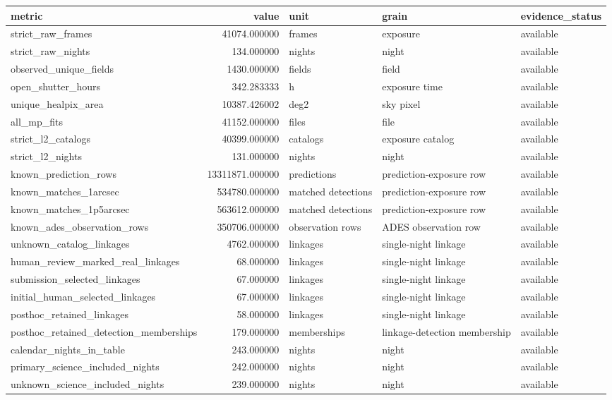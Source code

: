 \begin{tabular}{lrlll}
\toprule
metric & value & unit & grain & evidence\_status \\
\midrule
strict\_raw\_frames & 41074.000000 & frames & exposure & available \\
strict\_raw\_nights & 134.000000 & nights & night & available \\
observed\_unique\_fields & 1430.000000 & fields & field & available \\
open\_shutter\_hours & 342.283333 & h & exposure time & available \\
unique\_healpix\_area & 10387.426002 & deg2 & sky pixel & available \\
all\_mp\_fits & 41152.000000 & files & file & available \\
strict\_l2\_catalogs & 40399.000000 & catalogs & exposure catalog & available \\
strict\_l2\_nights & 131.000000 & nights & night & available \\
known\_prediction\_rows & 13311871.000000 & predictions & prediction-exposure row & available \\
known\_matches\_1arcsec & 534780.000000 & matched detections & prediction-exposure row & available \\
known\_matches\_1p5arcsec & 563612.000000 & matched detections & prediction-exposure row & available \\
known\_ades\_observation\_rows & 350706.000000 & observation rows & ADES observation row & available \\
unknown\_catalog\_linkages & 4762.000000 & linkages & single-night linkage & available \\
human\_review\_marked\_real\_linkages & 68.000000 & linkages & single-night linkage & available \\
submission\_selected\_linkages & 67.000000 & linkages & single-night linkage & available \\
initial\_human\_selected\_linkages & 67.000000 & linkages & single-night linkage & available \\
posthoc\_retained\_linkages & 58.000000 & linkages & single-night linkage & available \\
posthoc\_retained\_detection\_memberships & 179.000000 & memberships & linkage-detection membership & available \\
calendar\_nights\_in\_table & 243.000000 & nights & night & available \\
primary\_science\_included\_nights & 242.000000 & nights & night & available \\
unknown\_science\_included\_nights & 239.000000 & nights & night & available \\
\bottomrule
\end{tabular}
